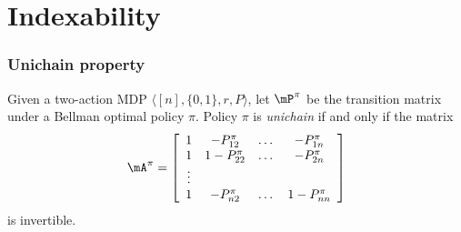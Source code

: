 \begingroup

\let\clearpage\relax
\chapter{Indexability}
\label{chp:apx_indexability}

\subsection{Unichain property}

\begin{lem}
\label{lem:invertible}
Given a two-action MDP $\langle [n], \{0,1\}, r, P\rangle$, let $\mP^\pi$ be the transition matrix under a Bellman optimal policy $\pi$.
Policy $\pi$ is \emph{unichain} if and only if the matrix
\begin{align*}
    \mA^{\pi}
        = \left[\begin{array}{ccccc}
                1 & - P_{12}^{\pi} & \dots & -P_{1n}^{\pi}\\
                1 & 1-P_{22}^{\pi} & \dots & -P_{2n}^{\pi}\\
                \vdots\\
                1 &  -P_{n2}^{\pi} & \dots &1-P_{nn}^{\pi}
    \end{array}\right]
\end{align*}
is invertible.
\end{lem}
